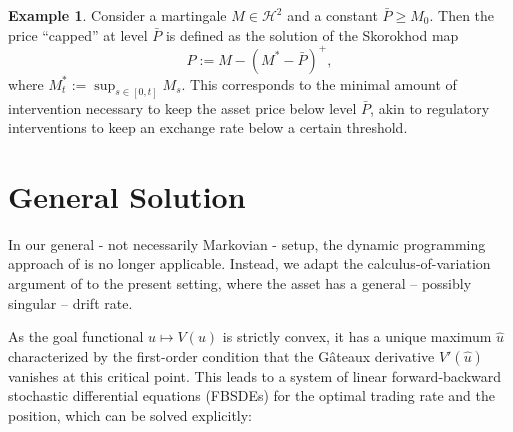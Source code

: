 \documentclass[11pt]{article}
\theoremstyle{definition}
\newtheorem{eg}[thm]{Example}
\theoremstyle{remark}
\begin{document}
\begin{eg}\label{ex:target}
Consider a martingale $M\in\mathcal{H}^2$ and a constant $\bar{P} \geq M_0$. Then the price ``capped'' at level $\bar{P}$ is defined as the solution of the Skorokhod map 
$$P:=M-(M^*-\bar{P})^+,$$
where $M^*_t:=\sup_{s\in[0,t]} M_s$. This corresponds to the minimal amount of intervention necessary to keep the asset price below level $\bar{P}$, akin to regulatory interventions to keep an exchange rate below a certain threshold.
\end{eg}


\section{General Solution}\label{s:result}

In our general - not necessarily Markovian - setup, the dynamic programming approach of \cite{lehalle2017incorporating} is no longer applicable. Instead, we adapt the calculus-of-variation argument of \cite{bank2017hedging,bouchard2017equilibrium} to the present setting, where the asset has a general -- possibly singular -- drift rate. 

As the goal functional $u\mapsto V(u)$ is strictly convex, it has a unique maximum $\hat{u}$ characterized by the first-order condition that the G\^ateaux derivative $V'(\hat{u})$ vanishes at this critical point. This leads to a system of linear forward-backward stochastic differential equations (FBSDEs) for the optimal trading rate and the position, which can be solved explicitly:
\end{document}
